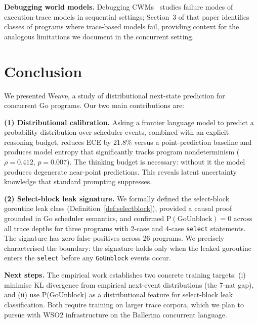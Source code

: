 \documentclass[sigconf,review,anonymous]{acmart}
\begin{document}
\textbf{Debugging world models.} Debugging CWMs~\cite{debugging_cwm2026} studies
failure modes of execution-trace models in sequential settings; Section~3 of that
paper identifies classes of programs where trace-based models fail, providing
context for the analogous limitations we document in the concurrent setting.

\section{Conclusion}

We presented Weave, a study of distributional next-state prediction for concurrent
Go programs. Our two main contributions are:

\textbf{(1) Distributional calibration.} Asking a frontier language model to
predict a probability distribution over scheduler events, combined with an explicit
reasoning budget, reduces ECE by 21.8\% versus a point-prediction baseline and
produces model entropy that significantly tracks program nondeterminism
($\rho{=}0.412$, $p{=}0.007$). The thinking budget is necessary: without it the
model produces degenerate near-point predictions. This reveals latent uncertainty
knowledge that standard prompting suppresses.

\textbf{(2) Select-block leak signature.} We formally defined the select-block
goroutine leak class (Definition~\ref{def:selectblock}), provided a causal proof
grounded in Go scheduler semantics, and confirmed $\mathrm{P(GoUnblock)=0}$
across all trace depths for three programs with 2-case and 4-case
\texttt{select} statements. The signature has zero false positives across 26
programs. We precisely characterised the boundary: the signature holds only when
the leaked goroutine enters the \texttt{select} before any \texttt{GoUnblock}
events occur.

\textbf{Next steps.} The empirical work establishes two concrete training targets:
(i) minimise KL divergence from empirical next-event distributions (the 7-nat
gap), and (ii) use P(GoUnblock) as a distributional feature for select-block leak
classification. Both require training on larger trace corpora, which we plan to
pursue with WSO2 infrastructure on the Ballerina concurrent language.



\end{document}
